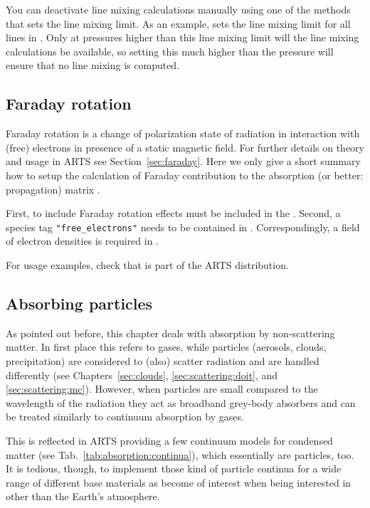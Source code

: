 You can deactivate line mixing calculations manually using one of the methods that sets the line mixing limit.
As an example,  sets the line mixing limit for all lines in .
Only at pressures higher than this line mixing limit will the line mixing calculations be available, so setting this
much higher than the pressure will ensure that no line mixing is computed.

\subsection{Faraday rotation}
\label{sec:absorption:faraday}

Faraday rotation is a change of polarization state of radiation in interaction
with (free) electrons in presence of a static magnetic field. For further
details on theory and usage in ARTS see Section~\ref{sec:faraday}.
Here we only give a short summary how to setup the calculation of Faraday
contribution to the absorption (or better: propagation) matrix
.

First, to include Faraday rotation effects
 must be included in the
. Second, a species tag
\verb|"free_electrons"| needs to be contained in .
Correspondingly, a field of electron densities is required in
.

For usage examples, check  that
is part of the ARTS distribution.

\subsection{Absorbing particles}
\label{sec:absorption:particles}

As pointed out before, this chapter deals with absorption by non-scattering
matter. In first place this refers to gases, while particles (aerosols, clouds,
precipitation) are considered to (also) scatter radiation and are handled
differently (see Chapters~\ref{sec:clouds}, \ref{sec:scattering:doit}, and
\ref{sec:scattering:mc}).
However, when particles are small compared to the wavelength of the radiation
they act as broadband grey-body absorbers and can be treated similarly to
continuum absorption by gases.

This is reflected in ARTS providing a few continuum models for condensed
matter (see Tab.~\ref{tab:absorption:continua}), which essentially are
particles, too.
It is tedious, though, to implement those kind of particle continua for a wide
range of different base materials as become of interest when being interested in
other than the Earth's atmosphere.

